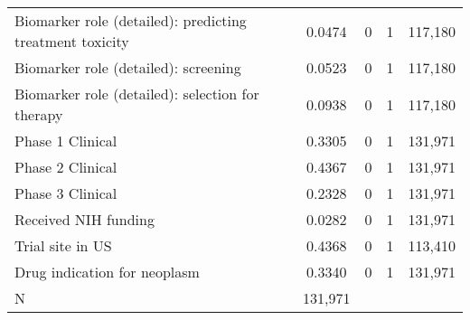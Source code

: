 \begin{table}[htbp]
\begin{tabular}{l*{1}{cccc}}
Biomarker role (detailed): predicting treatment toxicity&      0.0474&           0&           1&     117,180\\
Biomarker role (detailed): screening&      0.0523&           0&           1&     117,180\\
Biomarker role (detailed): selection for therapy&      0.0938&           0&           1&     117,180\\
Phase 1 Clinical    &      0.3305&           0&           1&     131,971\\
Phase 2 Clinical    &      0.4367&           0&           1&     131,971\\
Phase 3 Clinical    &      0.2328&           0&           1&     131,971\\
Received NIH funding&      0.0282&           0&           1&     131,971\\
Trial site in US    &      0.4368&           0&           1&     113,410\\
Drug indication for neoplasm&      0.3340&           0&           1&     131,971\\
\hline
N                   &     131,971&            &            &            \\
\hline\hline
\end{tabular}
\end{table}
